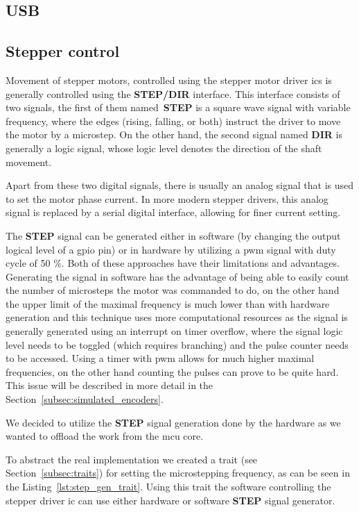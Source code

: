 \subsection{USB}
\label{subsec:usb_impl}

\subsection{Stepper control}
\label{subsec:stepper_control}
Movement of stepper motors, controlled using the stepper motor driver \acs{ic}s is generally controlled using the \textbf{STEP/DIR} interface.
This interface consists of two signals, the first of them named~\textbf{STEP} is a square wave signal with variable frequency, where the edges (rising, falling, or both) instruct the driver to move the motor by a microstep.
On the other hand, the second signal named \textbf{DIR} is generally a logic signal, whose logic level denotes the direction of the shaft movement.

Apart from these two digital signals, there is usually an analog signal that is used to set the motor phase current.
In more modern stepper drivers, this analog signal is replaced by a serial digital interface, allowing for finer current setting.

The \textbf{STEP} signal can be generated either in software (by changing the output logical level of a \acs{gpio} pin) or in hardware by utilizing a \acs{pwm} signal with duty cycle of 50 \%.
Both of these approaches have their limitations and advantages.
Generating the signal in software has the advantage of being able to easily count the number of microsteps the motor was commanded to do, on the other hand the upper limit of the maximal frequency is much lower than with hardware generation and this technique uses more computational resources as the signal is generally generated using an interrupt on timer overflow, where the signal logic level needs to be toggled (which requires branching) and the pulse counter needs to be accessed.
Using a timer with \acs{pwm} allows for much higher maximal frequencies, on the other hand counting the pulses can prove to be quite hard.
This issue will be described in more detail in the Section~\ref{subsec:simulated_encoders}.

We decided to utilize the \textbf{STEP} signal generation done by the hardware as we wanted to offload the work from the \acs{mcu} core.

To abstract the real implementation we created a trait (see Section~\ref{subsec:traits}) for setting the microstepping frequency, as can be seen in the Listing~\ref{lst:step_gen_trait}.
Using this trait the software controlling the stepper driver \acs{ic} can use either hardware or software \textbf{STEP} signal generator.

